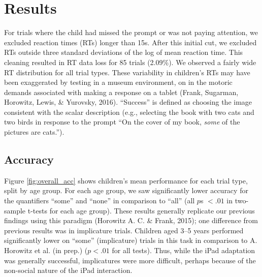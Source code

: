 \documentclass[10pt, letterpaper]{article}
\begin{document}
\section{Results}\label{results}

For trials where the child had missed the prompt or was not paying
attention, we excluded reaction times (RTs) longer than 15s. After this
initial cut, we excluded RTs outside three standard deviations of the
log of mean reaction time. This cleaning resulted in RT data loss for 85
trials (2.09\%). We observed a fairly wide RT distribution for all trial
types. These variability in children's RTs may have been exaggerated by
testing in a museum environment, on in the motoric demands associated
with making a response on a tablet (Frank, Sugarman, Horowitz, Lewis, \&
Yurovsky, 2016). ``Success'' is defined as choosing the image consistent
with the scalar description (e.g., selecting the book with two cats and
two birds in response to the prompt ``On the cover of my book,
\emph{some} of the pictures are cats.'').

\subsection{Accuracy}\label{accuracy}

Figure \ref{fig:overall_acc} shows children's mean performance for each
trial type, split by age group. For each age group, we saw significantly
lower accuracy for the quantifiers ``some'' and ``none'' in comparison
to ``all'' (all \(p\)s \(< .01\) in two-sample t-tests for each age
group). These results generally replicate our previous findings using
this paradigm (Horowitz A. C. \& Frank, 2015); one difference from
previous results was in implicature trials. Children aged 3--5 years
performed significantly lower on ``some'' (implicature) trials in this
task in comparison to A. Horowitz et al. (in prep.) (\(p < .01\) for all
tests). Thus, while the iPad adaptation was generally successful,
implicatures were more difficult, perhaps because of the non-social
nature of the iPad interaction.
\end{document}
